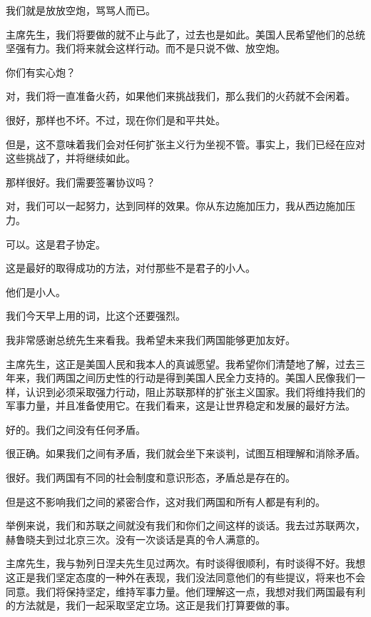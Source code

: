 我们就是放放空炮，骂骂人而已。

主席先生，我们将要做的就不止与此了，过去也是如此。美国人民希望他们的总统坚强有力。我们将来就会这样行动。而不是只说不做、放空炮。

你们有实心炮？

对，我们将一直准备火药，如果他们来挑战我们，那么我们的火药就不会闲着。

很好，那样也不坏。不过，现在你们是和平共处。

但是，这不意味着我们会对任何扩张主义行为坐视不管。事实上，我们已经在应对这些挑战了，并将继续如此。

那样很好。我们需要签署协议吗？

对，我们可以一起努力，达到同样的效果。你从东边施加压力，我从西边施加压力。

可以。这是君子协定。

这是最好的取得成功的方法，对付那些不是君子的小人。

他们是小人。

我们今天早上用的词，比这个还要强烈。

我非常感谢总统先生来看我。我希望未来我们两国能够更加友好。

主席先生，这正是美国人民和我本人的真诚愿望。我希望你们清楚地了解，过去三年来，我们两国之间历史性的行动是得到美国人民全力支持的。美国人民像我们一样，认识到必须采取强力行动，阻止苏联那样的扩张主义国家。我们将维持我们的军事力量，并且准备使用它。在我们看来，这是让世界稳定和发展的最好方法。

好的。我们之间没有任何矛盾。

很正确。如果我们之间有矛盾，我们就会坐下来谈判，试图互相理解和消除矛盾。

很好。我们两国有不同的社会制度和意识形态，矛盾总是存在的。

但是这不影响我们之间的紧密合作，这对我们两国和所有人都是有利的。

举例来说，我们和苏联之间就没有我们和你们之间这样的谈话。我去过苏联两次，赫鲁晓夫到过北京三次。没有一次谈话是真的令人满意的。

主席先生，我与勃列日涅夫先生见过两次。有时谈得很顺利，有时谈得不好。我想这正是我们坚定态度的一种外在表现，我们没法同意他们的有些提议，将来也不会同意。我们将保持坚定，维持军事力量。他们理解这一点，我想对我们两国最有利的方法就是，我们一起采取坚定立场。这正是我们打算要做的事。

